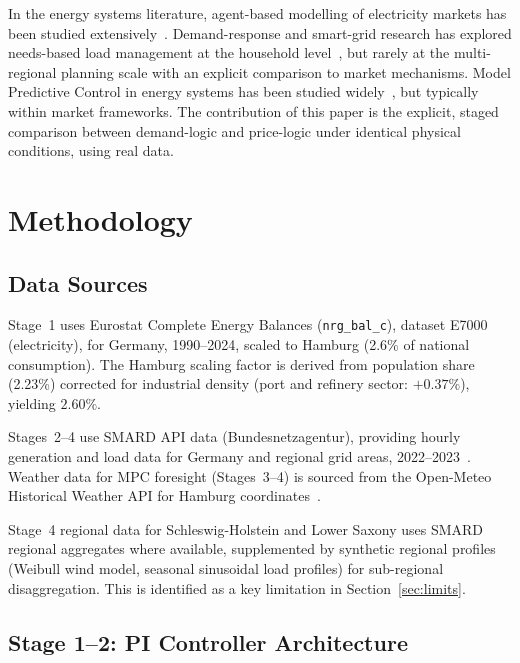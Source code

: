 \documentclass[12pt]{article}
\begin{document}
In the energy systems literature, agent-based modelling of electricity markets has
been studied extensively~\citep{weidlich2008survey, ringler2016agent}.
Demand-response and smart-grid research has explored needs-based load management at
the household level~\citep{siano2014demand}, but rarely at the multi-regional
planning scale with an explicit comparison to market mechanisms.
Model Predictive Control in energy systems has been studied widely~\citep{halvgaard2012mpc, parisio2014mpc},
but typically within market frameworks.
The contribution of this paper is the explicit, staged comparison between demand-logic
and price-logic under identical physical conditions, using real data.

\section{Methodology}
\label{sec:methods}

\subsection{Data Sources}

Stage~1 uses Eurostat Complete Energy Balances (\texttt{nrg\_bal\_c}), dataset E7000
(electricity), for Germany, 1990--2024, scaled to Hamburg (2.6\% of national
consumption).
The Hamburg scaling factor is derived from population share (2.23\%) corrected for
industrial density (port and refinery sector: $+0.37\%$), yielding $2.60\%$.

Stages~2--4 use SMARD API data (Bundesnetzagentur), providing hourly generation and
load data for Germany and regional grid areas, 2022--2023~\citep{smard2024}.
Weather data for MPC foresight (Stages~3--4) is sourced from the Open-Meteo
Historical Weather API for Hamburg coordinates~\citep{openmeteo2024}.

Stage~4 regional data for Schleswig-Holstein and Lower Saxony uses SMARD regional
aggregates where available, supplemented by synthetic regional profiles (Weibull wind
model, seasonal sinusoidal load profiles) for sub-regional disaggregation.
This is identified as a key limitation in Section~\ref{sec:limits}.

\subsection{Stage 1--2: PI Controller Architecture}
\end{document}
